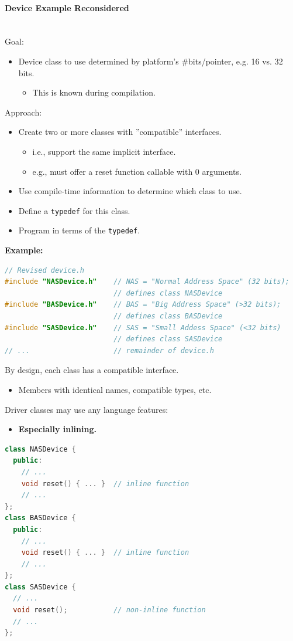 \paragraph{Device Example Reconsidered}\\
Goal:
\begin{itemize}
  \item Device class to use determined by platform's #bits/pointer, e.g. 16 vs. 32 bits.
  \begin{itemize}
    \item This is known during compilation.
  \end{itemize}
\end{itemize}
Approach:
\begin{itemize}
  \item Create two or more classes with ''compatible'' interfaces.
  \begin{itemize}
    \item i.e., support the same implicit interface.
    \item e.g., must offer a reset function callable with 0 arguments.
  \end{itemize}
  \item Use compile-time information to determine which class to use.
  \item Define a \lstinline{typedef} for this class.
  \item Program in terms of the \lstinline{typedef}.
\end{itemize}
\textbf{Example:}
\begin{lstlisting}[language=C++]
// Revised device.h
#include "NASDevice.h"    // NAS = "Normal Address Space" (32 bits);
                          // defines class NASDevice
#include "BASDevice.h"    // BAS = "Big Address Space" (>32 bits);
                          // defines class BASDevice
#include "SASDevice.h"    // SAS = "Small Addess Space" (<32 bits)
                          // defines class SASDevice
// ...                    // remainder of device.h
\end{lstlisting}
By design, each class has a compatible interface.
\begin{itemize}
  \item Members with identical names, compatible types, etc.
\end{itemize}

Driver classes may use any language features:
\begin{itemize}
  \item \textbf{Especially inlining.}
\end{itemize}
\begin{lstlisting}[language=C++]
class NASDevice {
  public:
    // ...
    void reset() { ... }  // inline function
    // ...
};
class BASDevice {
  public:
    // ...
    void reset() { ... }  // inline function
    // ...
};
class SASDevice {
  // ...
  void reset();           // non-inline function
  // ...
};
\end{lstlisting}

